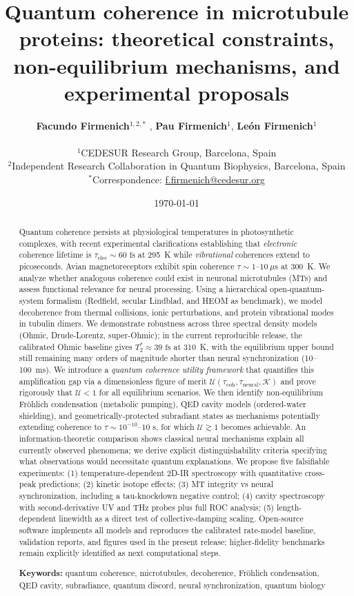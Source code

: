 \documentclass[twocolumn,10pt]{article}
\title{\textbf{Quantum coherence in microtubule proteins: theoretical
constraints, non-equilibrium mechanisms, and experimental proposals}}
\author{
    \textbf{Facundo Firmenich}$^{1,2,*}$ \orcidlink{0009-0002-6578-3811}, \textbf{Pau Firmenich}$^{1}$, \textbf{Le\'on Firmenich}$^{1}$ \\
    \\
    \small $^1$CEDESUR Research Group, Barcelona, Spain \\
    \small $^2$Independent Research Collaboration in Quantum Biophysics, Barcelona, Spain \\
    \small $^*$Correspondence: \href{mailto:f.firmenich@cedesur.org}{f.firmenich@cedesur.org}
}
\date{\today}
\newcommand{\fs}{\text{~fs}}
\begin{document}
\maketitle

\begin{abstract}
Quantum coherence persists at physiological temperatures in photosynthetic
complexes, with recent experimental clarifications establishing that
\textit{electronic} coherence lifetime is $\tau_{\text{elec}} \sim 60\fs$
at 295~K while \textit{vibrational} coherences extend to picoseconds. Avian
magnetoreceptors exhibit spin coherence $\tau \sim 1\text{--}10~\mu\text{s}$
at 300~K. We analyze whether analogous coherence could exist in neuronal
microtubules (MTs) and assess functional relevance for neural processing.
Using a hierarchical open-quantum-system formalism (Redfield, secular
Lindblad, and HEOM as benchmark), we model decoherence from thermal
collisions, ionic perturbations, and protein vibrational modes in tubulin
dimers. We demonstrate robustness across three spectral density models
(Ohmic, Drude-Lorentz, super-Ohmic); in the current reproducible release,
the calibrated Ohmic baseline gives $T_2^* \approx 39\fs$ at 310~K, with
the equilibrium upper bound still remaining many orders of magnitude shorter
than neural synchronization (10--100~ms). We introduce a \textit{quantum
coherence utility framework} that quantifies this amplification gap via a
dimensionless figure of merit $\mathcal{U}(\tau_{\text{coh}},
\tau_{\text{neural}},\mathcal{K})$ and prove rigorously that $\mathcal{U} < 1$
for all equilibrium scenarios. We then identify non-equilibrium Fr\"ohlich
condensation (metabolic pumping), QED cavity models (ordered-water
shielding), and geometrically-protected subradiant states as mechanisms
potentially extending coherence to $\tau \sim 10^{-10}\text{--}10\text{~s}$,
for which $\mathcal{U} \gtrsim 1$ becomes achievable. An information-theoretic
comparison shows classical neural mechanisms explain all currently observed
phenomena; we derive explicit distinguishability criteria specifying what
observations would necessitate quantum explanations. We propose five
falsifiable experiments: (1) temperature-dependent 2D-IR spectroscopy with
quantitative cross-peak predictions; (2) kinetic isotope effects; (3) MT
integrity vs neural synchronization, including a tau-knockdown negative
control; (4) cavity spectroscopy with second-derivative UV and THz probes
plus full ROC analysis; (5) length-dependent linewidth as a direct test of
collective-damping scaling. Open-source software implements all models and
reproduces the calibrated rate-model baseline, validation reports, and
figures used in the present release; higher-fidelity benchmarks remain
explicitly identified as next computational steps.

\vspace{0.2cm}

\noindent\textbf{Keywords:} quantum coherence, microtubules, decoherence,
Fr\"ohlich condensation, QED cavity, subradiance, quantum discord, neural
synchronization, quantum biology
\end{abstract}
\end{document}
